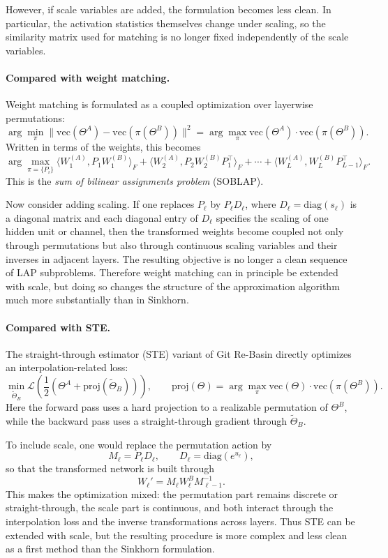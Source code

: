 \documentclass[11pt,a4paper]{article}
\begin{document}
However, if scale variables are added, the formulation becomes less clean. In particular, the activation statistics themselves change under scaling, so the similarity matrix used for matching is no longer fixed independently of the scale variables.

\paragraph{Compared with weight matching.}
Weight matching is formulated as a coupled optimization over layerwise permutations:
\[
\arg\min_{\pi} \|\mathrm{vec}(\Theta^A) - \mathrm{vec}(\pi(\Theta^B))\|^2
=
\arg\max_{\pi} \mathrm{vec}(\Theta^A)\cdot \mathrm{vec}(\pi(\Theta^B)).
\]
Written in terms of the weights, this becomes
\[
\arg\max_{\pi=\{P_i\}}
\langle W_1^{(A)}, P_1 W_1^{(B)} \rangle_F
+
\langle W_2^{(A)}, P_2 W_2^{(B)} P_1^\top \rangle_F
+ \cdots +
\langle W_L^{(A)}, W_L^{(B)} P_{L-1}^\top \rangle_F.
\]
This is the \emph{sum of bilinear assignments problem} (SOBLAP). 

Now consider adding scaling. If one replaces \(P_\ell\) by \(P_\ell D_\ell\), where \(D_\ell = \mathrm{diag}(s_\ell)\) is a diagonal matrix and each diagonal entry of \(D_\ell\) specifies the scaling of one hidden unit or channel, then the transformed weights become coupled not only through permutations but also through continuous scaling variables and their inverses in adjacent layers. The resulting objective is no longer a clean sequence of LAP subproblems. Therefore weight matching can in principle be extended with scale, but doing so changes the structure of the approximation algorithm much more substantially than in Sinkhorn.

\paragraph{Compared with STE.}
The straight-through estimator (STE) variant of Git Re-Basin directly optimizes an interpolation-related loss:
\[
\min_{\widetilde{\Theta}_B}
\mathcal{L}\!\left(
\frac{1}{2}
\left(
\Theta^A + \mathrm{proj}(\widetilde{\Theta}_B)
\right)
\right),
\qquad
\mathrm{proj}(\Theta)
=
\arg\max_{\pi}
\mathrm{vec}(\Theta)\cdot \mathrm{vec}(\pi(\Theta^B)).
\]
Here the forward pass uses a hard projection to a realizable permutation of \(\Theta^B\), while the backward pass uses a straight-through gradient through \(\widetilde{\Theta}_B\).

To include scale, one would replace the permutation action by
\[
M_\ell = P_\ell D_\ell,
\qquad
D_\ell = \mathrm{diag}(e^{u_\ell}),
\]
so that the transformed network is built through
\[
W_\ell' = M_\ell W_\ell^B M_{\ell-1}^{-1}.
\]
This makes the optimization mixed: the permutation part remains discrete or straight-through, the scale part is continuous, and both interact through the interpolation loss and the inverse transformations across layers. Thus STE can be extended with scale, but the resulting procedure is more complex and less clean as a first method than the Sinkhorn formulation.
\end{document}
